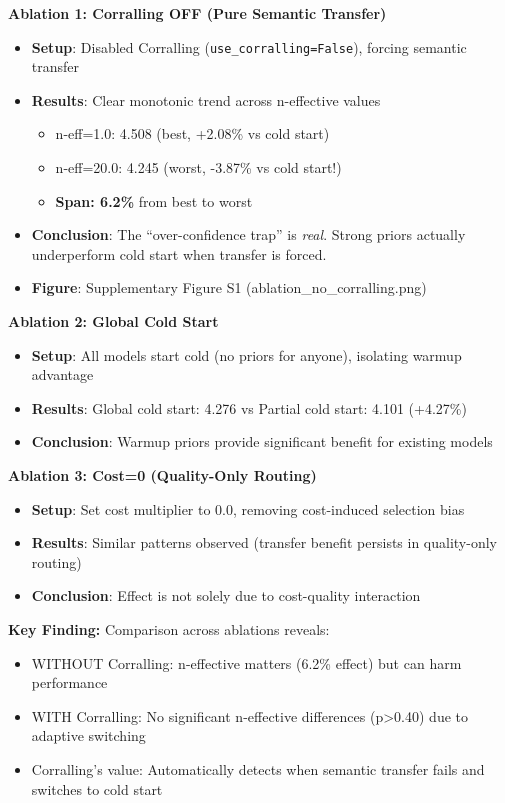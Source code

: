 \textbf{Ablation 1: Corralling OFF (Pure Semantic Transfer)}
\begin{itemize}[leftmargin=*, itemsep=2pt]
    \item \textbf{Setup}: Disabled Corralling (\texttt{use\_corralling=False}), forcing semantic transfer
    \item \textbf{Results}: Clear monotonic trend across n-effective values
    \begin{itemize}
        \item n-eff=1.0: 4.508 (best, +2.08\% vs cold start)
        \item n-eff=20.0: 4.245 (worst, -3.87\% vs cold start!)
        \item \textbf{Span: 6.2\%} from best to worst
    \end{itemize}
    \item \textbf{Conclusion}: The ``over-confidence trap'' is \textit{real}. Strong priors actually underperform cold start when transfer is forced.
    \item \textbf{Figure}: Supplementary Figure S1 (ablation\_no\_corralling.png)
\end{itemize}

\textbf{Ablation 2: Global Cold Start}
\begin{itemize}[leftmargin=*, itemsep=2pt]
    \item \textbf{Setup}: All models start cold (no priors for anyone), isolating warmup advantage
    \item \textbf{Results}: Global cold start: 4.276 vs Partial cold start: 4.101 (+4.27\%)
    \item \textbf{Conclusion}: Warmup priors provide significant benefit for existing models
\end{itemize}

\textbf{Ablation 3: Cost=0 (Quality-Only Routing)}
\begin{itemize}[leftmargin=*, itemsep=2pt]
    \item \textbf{Setup}: Set cost multiplier to 0.0, removing cost-induced selection bias
    \item \textbf{Results}: Similar patterns observed (transfer benefit persists in quality-only routing)
    \item \textbf{Conclusion}: Effect is not solely due to cost-quality interaction
\end{itemize}

\textbf{Key Finding:} Comparison across ablations reveals:
\begin{itemize}[leftmargin=*, itemsep=2pt]
    \item WITHOUT Corralling: n-effective matters (6.2\% effect) but can harm performance
    \item WITH Corralling: No significant n-effective differences (p>0.40) due to adaptive switching
    \item Corralling's value: Automatically detects when semantic transfer fails and switches to cold start
\end{itemize}

